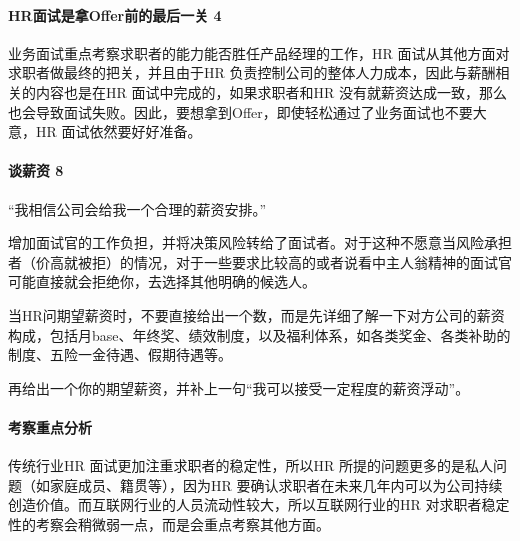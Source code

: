 \documentclass[letterpaper,11pt,english]{sphinxmanual}
\begin{document}
\paragraph{HR面试是拿Offer前的最后一关 4\sphinxfootnotemark[776]}
\label{\detokenize{chapter_interview/HR:hroffer-4}}%
\begin{footnotetext}[776]\sphinxAtStartFootnote
{}
%
\end{footnotetext}\ignorespaces 
业务面试重点考察求职者的能力能否胜任产品经理的工作，HR
面试从其他方面对求职者做最终的把关，并且由于HR
负责控制公司的整体人力成本，因此与薪酬相关的内容也是在HR
面试中完成的，如果求职者和HR
没有就薪资达成一致，那么也会导致面试失败。因此，要想拿到Offer，即使轻松通过了业务面试也不要大意，HR
面试依然要好好准备。


\paragraph{谈薪资 8\sphinxfootnotemark[777]}
\label{\detokenize{chapter_interview/HR:id2}}%
\begin{footnotetext}[777]\sphinxAtStartFootnote
{}
%
\end{footnotetext}\ignorespaces 
“我相信公司会给我一个合理的薪资安排。”

增加面试官的工作负担，并将决策风险转给了面试者。对于这种不愿意当风险承担者（价高就被拒）的情况，对于一些要求比较高的或者说看中主人翁精神的面试官可能直接就会拒绝你，去选择其他明确的候选人。

当HR问期望薪资时，不要直接给出一个数，而是先详细了解一下对方公司的薪资构成，包括月base、年终奖、绩效制度，以及福利体系，如各类奖金、各类补助的制度、五险一金待遇、假期待遇等。%
\begin{footnote}[778]\sphinxAtStartFootnote
{}
%
\end{footnote}再给出一个你的期望薪资，并补上一句“我可以接受一定程度的薪资浮动”。

\begin{center}\end{center}  


\paragraph{考察重点分析}
\label{\detokenize{chapter_interview/HR:id3}}
传统行业HR 面试更加注重求职者的稳定性，所以HR
所提的问题更多的是私人问题（如家庭成员、籍贯等），因为HR
要确认求职者在未来几年内可以为公司持续创造价值。而互联网行业的人员流动性较大，所以互联网行业的HR
对求职者稳定性的考察会稍微弱一点，而是会重点考察其他方面。
\end{document}
